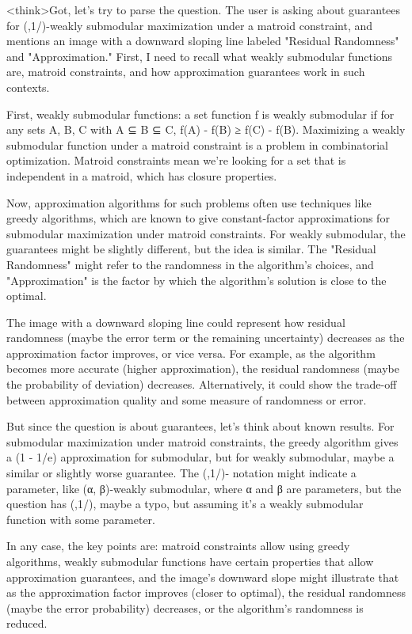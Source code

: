 <think>Got, let's try to parse the question. The user is asking about guarantees for (,1/)-weakly submodular maximization under a matroid constraint, and mentions an image with a downward sloping line labeled "Residual Randomness" and "Approximation." First, I need to recall what weakly submodular functions are, matroid constraints, and how approximation guarantees work in such contexts.

First, weakly submodular functions: a set function f is weakly submodular if for any sets A, B, C with A ⊆ B ⊆ C, f(A) - f(B) ≥ f(C) - f(B). Maximizing a weakly submodular function under a matroid constraint is a problem in combinatorial optimization. Matroid constraints mean we're looking for a set that is independent in a matroid, which has closure properties.

Now, approximation algorithms for such problems often use techniques like greedy algorithms, which are known to give constant-factor approximations for submodular maximization under matroid constraints. For weakly submodular, the guarantees might be slightly different, but the idea is similar. The "Residual Randomness" might refer to the randomness in the algorithm's choices, and "Approximation" is the factor by which the algorithm's solution is close to the optimal.

The image with a downward sloping line could represent how residual randomness (maybe the error term or the remaining uncertainty) decreases as the approximation factor improves, or vice versa. For example, as the algorithm becomes more accurate (higher approximation), the residual randomness (maybe the probability of deviation) decreases. Alternatively, it could show the trade-off between approximation quality and some measure of randomness or error.

But since the question is about guarantees, let's think about known results. For submodular maximization under matroid constraints, the greedy algorithm gives a (1 - 1/e) approximation for submodular, but for weakly submodular, maybe a similar or slightly worse guarantee. The (,1/)- notation might indicate a parameter, like (α, β)-weakly submodular, where α and β are parameters, but the question has (,1/), maybe a typo, but assuming it's a weakly submodular function with some parameter.

In any case, the key points are: matroid constraints allow using greedy algorithms, weakly submodular functions have certain properties that allow approximation guarantees, and the image's downward slope might illustrate that as the approximation factor improves (closer to optimal), the residual randomness (maybe the error probability) decreases, or the algorithm's randomness is reduced.

